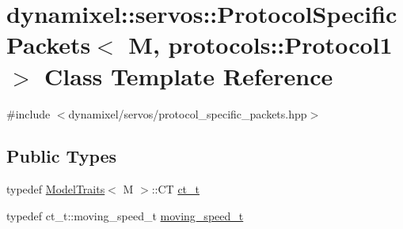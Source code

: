 \hypertarget{classdynamixel_1_1servos_1_1_protocol_specific_packets_3_01_m_00_01protocols_1_1_protocol1_01_4}{}\section{dynamixel\+:\+:servos\+:\+:Protocol\+Specific\+Packets$<$ M, protocols\+:\+:Protocol1 $>$ Class Template Reference}
\label{classdynamixel_1_1servos_1_1_protocol_specific_packets_3_01_m_00_01protocols_1_1_protocol1_01_4}


{\ttfamily \#include $<$dynamixel/servos/protocol\+\_\+specific\+\_\+packets.\+hpp$>$}

\subsection*{Public Types}
\begin{DoxyCompactItemize}
\item 
typedef \hyperlink{structdynamixel_1_1servos_1_1_model_traits}{Model\+Traits}$<$ M $>$\+::C\+T \hyperlink{classdynamixel_1_1servos_1_1_protocol_specific_packets_3_01_m_00_01protocols_1_1_protocol1_01_4_aaf41bdc8c76f4b48435902cb819a9912}{ct\+\_\+t}
\item 
typedef ct\+\_\+t\+::moving\+\_\+speed\+\_\+t \hyperlink{classdynamixel_1_1servos_1_1_protocol_specific_packets_3_01_m_00_01protocols_1_1_protocol1_01_4_a748789c4170e6821eecc8c6482487fa6}{moving\+\_\+speed\+\_\+t}
\end{DoxyCompactItemize}
